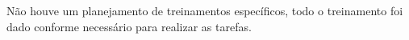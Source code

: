 Não houve um planejamento de treinamentos específicos, todo o treinamento foi dado conforme necessário para realizar as tarefas.\\

%
%
%
%
%
%
